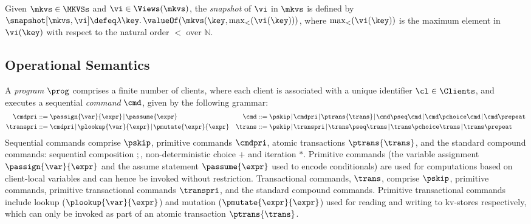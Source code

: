 \begin{definition}[Snapshots]
\label{def:snapshot}
Given $\mkvs \in \MKVSs$ and $\vi \in \Views(\mkvs)$, the \emph{snapshot} of $\vi$ in 
$\mkvs$ is defined by  $\snapshot[\mkvs, \vi] \defeq \lambda \key \ldotp \valueOf(\mkvs(\key, \max_{<}(\vi(\key)))$, 
where $\max_{<}(\vi(\key))$ is the maximum element in $\vi(\key)$ with respect to the natural 
order $<$ over $\mathbb{N}$.
\end{definition}


\subsection{Operational Semantics}

A \emph{program} \( \prog \) comprises a finite number of clients,
where each client is associated with a unique identifier \( \cl \in \Clients \), 
and executes a sequential \emph{command} $\cmd$, given by the following grammar:%
%
{%
\begin{align*}
\cmdpri & ::=  
\passign{\var}{\expr} \!\mid\! 
\passume{\expr} 
&
\cmd & ::=  
\pskip \!\mid\!
\cmdpri \!\mid\!  
\ptrans{\trans} \!\mid\! 
\cmd \pseq \cmd \!\mid\! 
\cmd \pchoice \cmd \!\mid\! 
\cmd \prepeat  
\\
\transpri & ::= 
\cmdpri \!\mid\!
\plookup{\var}{\expr} \!\mid\!
\pmutate{\expr}{\expr} 
&
\trans & ::=
\pskip \!\mid\!
\transpri \!\mid\! 
\trans \pseq \trans \!\mid\!
\trans \pchoice \trans \!\mid\!
\trans\prepeat    
\end{align*}%
}%
%
%
Sequential commands comprise $\pskip$, primitive commands $\cmdpri
$, atomic transactions
$\ptrans{\trans}$, and the standard
compound commands:
sequential composition \( ; \), non-deterministic choice \( + \) and iteration \( * \).
Primitive commands (the variable assignment
$\passign{\var}{\expr}$ and the assume statement $\passume{\expr}$
used to encode conditionals) are used for computations based on 
client-local variables 
and can hence be invoked without restriction. 
Transactional commands, $\trans$, 
comprise $\pskip$, primitive commands, 
primitive transactional commands $\transpri$, and the standard compound commands.
Primitive transactional commands include lookup ($\plookup{\var}{\expr}$) and mutation 
($\pmutate{\expr}{\expr}$) used for reading and writing to kv-stores respectively, which
can only be invoked as part of an atomic transaction $\ptrans{\trans}$.


